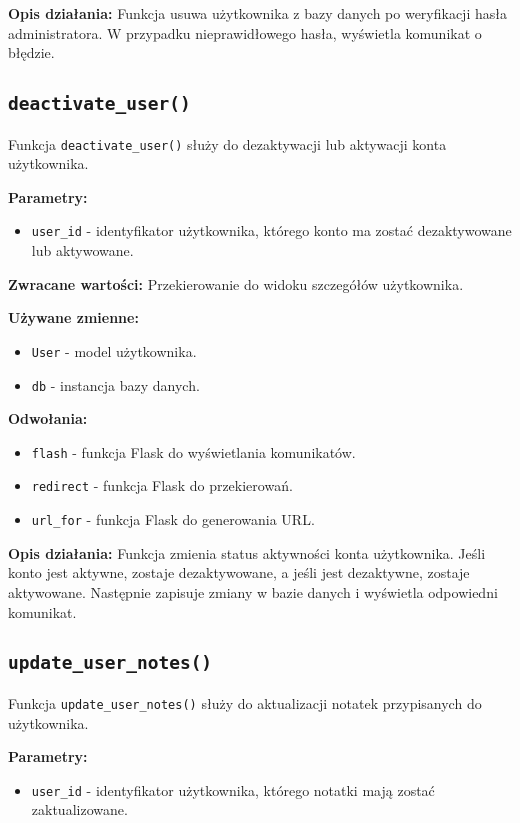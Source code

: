 \documentclass[12pt,a4paper]{report}
\begin{document}
\textbf{Opis działania:}
Funkcja usuwa użytkownika z bazy danych po weryfikacji hasła administratora. W przypadku nieprawidłowego hasła, wyświetla komunikat o błędzie.

\subsection{\texttt{deactivate\_user()}}
\label{sec:deactivate_user}
Funkcja \texttt{deactivate\_user()} służy do dezaktywacji lub aktywacji konta użytkownika.

\textbf{Parametry:}
\begin{itemize}
    \item \texttt{user\_id} - identyfikator użytkownika, którego konto ma zostać dezaktywowane lub aktywowane.
\end{itemize}

\textbf{Zwracane wartości:} Przekierowanie do widoku szczegółów użytkownika.

\textbf{Używane zmienne:}
\begin{itemize}
    \item \texttt{User} - model użytkownika.
    \item \texttt{db} - instancja bazy danych.
\end{itemize}

\textbf{Odwołania:}
\begin{itemize}
    \item \texttt{flash} - funkcja Flask do wyświetlania komunikatów.
    \item \texttt{redirect} - funkcja Flask do przekierowań.
    \item \texttt{url\_for} - funkcja Flask do generowania URL.
\end{itemize}

\textbf{Opis działania:}
Funkcja zmienia status aktywności konta użytkownika. Jeśli konto jest aktywne, zostaje dezaktywowane, a jeśli jest dezaktywne, zostaje aktywowane. Następnie zapisuje zmiany w bazie danych i wyświetla odpowiedni komunikat.

\subsection{\texttt{update\_user\_notes()}}
\label{sec:update_user_notes}
Funkcja \texttt{update\_user\_notes()} służy do aktualizacji notatek przypisanych do użytkownika.

\textbf{Parametry:}
\begin{itemize}
    \item \texttt{user\_id} - identyfikator użytkownika, którego notatki mają zostać zaktualizowane.
\end{itemize}
\end{document}
